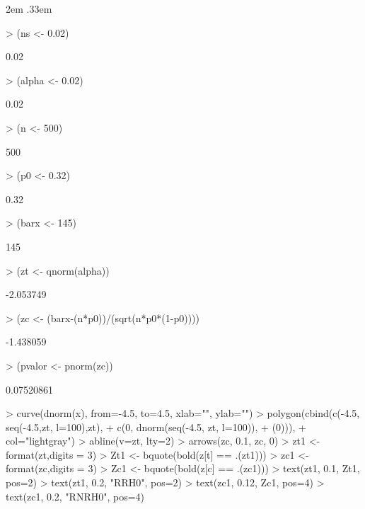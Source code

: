 \documentclass{article}
\newenvironment{ManualExercise}
  {\begin{list}{}{\leftmargin \QuestionIndent
    \partopsep0pt \parsep\parskip \topsep\QuestionBefore
    \itemsep\QuestionBefore \labelwidth2em
    \labelsep.33em
    \usecounter{Question}}}
  {\end{list}}
\begin{document}
\begin{Exercise}
\begin{ManualExercise}
\begin{Schunk}
\begin{Sinput}
> (ns <- 0.02)
\end{Sinput}
\begin{Soutput}
[1] 0.02
\end{Soutput}
\begin{Sinput}
> (alpha <- 0.02)
\end{Sinput}
\begin{Soutput}
[1] 0.02
\end{Soutput}
\begin{Sinput}
> (n <- 500)
\end{Sinput}
\begin{Soutput}
[1] 500
\end{Soutput}
\begin{Sinput}
> (p0 <- 0.32)
\end{Sinput}
\begin{Soutput}
[1] 0.32
\end{Soutput}
\begin{Sinput}
> (barx <- 145)
\end{Sinput}
\begin{Soutput}
[1] 145
\end{Soutput}
\begin{Sinput}
> (zt <- qnorm(alpha))
\end{Sinput}
\begin{Soutput}
[1] -2.053749
\end{Soutput}
\begin{Sinput}
> (zc <- (barx-(n*p0))/(sqrt(n*p0*(1-p0))))
\end{Sinput}
\begin{Soutput}
[1] -1.438059
\end{Soutput}
\begin{Sinput}
> (pvalor <- pnorm(zc))
\end{Sinput}
\begin{Soutput}
[1] 0.07520861
\end{Soutput}
\begin{Sinput}
> curve(dnorm(x), from=-4.5, to=4.5, xlab="", ylab="")
> polygon(cbind(c(-4.5, seq(-4.5,zt, l=100),zt),
+               c(0, dnorm(seq(-4.5, zt, l=100)),
+                 (0))),
+         col="lightgray")
> abline(v=zt, lty=2)
> arrows(zc, 0.1, zc, 0)
> zt1 <- format(zt,digits = 3)
> Zt1 <- bquote(bold(z[t] == .(zt1)))
> zc1 <- format(zc,digits = 3)
> Zc1 <- bquote(bold(z[c] == .(zc1)))
> text(zt1, 0.1, Zt1, pos=2)
> text(zt1, 0.2, "RRH0", pos=2)
> text(zc1, 0.12, Zc1, pos=4)
> text(zc1, 0.2, "RNRH0", pos=4)

\end{Sinput}
\end{Schunk}
\end{ManualExercise}
\end{Exercise}
\end{document}
